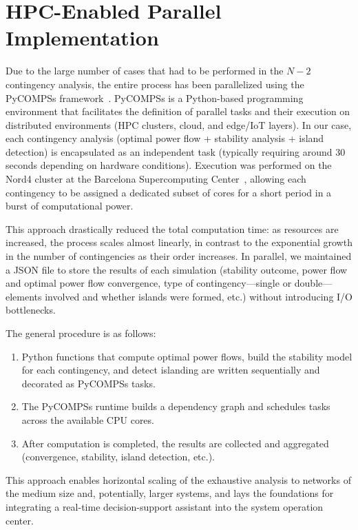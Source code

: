 \documentclass[journal]{IEEEtran}
\begin{document}
\section{HPC-Enabled Parallel Implementation}

Due to the large number of cases that had to be performed in the $N-2$ contingency analysis, the entire process has been parallelized using the PyCOMPSs framework~\cite{pycompss_softx, pycompss_tejedor2017}. PyCOMPSs is a Python-based programming environment that facilitates the definition of parallel tasks and their execution on distributed environments (HPC clusters, cloud, and edge/IoT layers). In our case, each contingency analysis (optimal power flow + stability analysis + island detection) is encapsulated as an independent task (typically requiring around 30 seconds depending on hardware conditions). Execution was performed on the Nord4 cluster at the Barcelona Supercomputing Center~\cite{nord4_bsc}, allowing each contingency to be assigned a dedicated subset of cores for a short period in a burst of computational power.

This approach drastically reduced the total computation time: as resources are increased, the process scales almost linearly, in contrast to the exponential growth in the number of contingencies as their order increases. In parallel, we maintained a JSON file to store the results of each simulation (stability outcome, power flow and optimal power flow convergence, type of contingency—single or double—elements involved and whether islands were formed, etc.) without introducing I/O bottlenecks.

The general procedure is as follows:
\begin{enumerate}
    \item Python functions that compute optimal power flows, build the stability model for each contingency, and detect islanding are written sequentially and decorated as PyCOMPSs tasks.
    \item The PyCOMPSs runtime builds a dependency graph and schedules tasks across the available CPU cores.
    \item After computation is completed, the results are collected and aggregated (convergence, stability, island detection, etc.).
\end{enumerate}

This approach enables horizontal scaling of the exhaustive analysis to networks of the medium size and, potentially, larger systems, and lays the foundations for integrating a real-time decision-support assistant into the system operation center.
\end{document}
